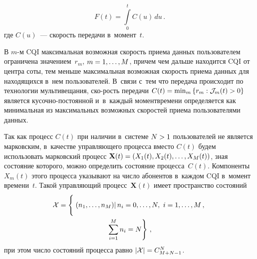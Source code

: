 \begin{multicols}{2}
\noindent
  \begin{equation*}
  F(t)=\int\limits_0^t C(u)\,du\,.
  \end{equation*}
где $C(u)$~--- скорость передачи в~момент~$t$.

  В $m$-м CQI максимальная возможная скорость приема данных 
пользователем ограничена значением~$r_m$, $m\hm=1,\ldots ,M$, причем чем 
дальше находится CQI от центра соты, тем меньше максимальная возможная 
скорость приема данных для находящихся в~нем пользователей. В~связи с~тем 
что передача происходит по технологии мультивещания, ско-\linebreak рость передачи 
$C(t)\hm= \min\nolimits_m \left\{ r_m: {\cal{J}}_m(t)>0\right\}$ является  
ку\-соч\-но-по\-сто\-ян\-ной и~в~каждый момент\linebreak времени определяется как 
минимальная из максимальных возможных скоростей приема пользователями 
данных.
  
  Так как процесс $C(t)$ при наличии в~системе $N\hm>1$ пользователей не 
является марковским, в~качестве управляющего процесса вместо $C(t)$ будем 
использовать марковский процесс $\mathbf{X}(t)\hm= \left( X_1(t), X_2(t), \ldots , 
X_M(t)\right)$, зная состояние которого, можно определить состояние 
процесса~$C(t)$. Компоненты~$X_m(t)$ этого процесса указывают на число 
абонентов в~каждом CQI в~момент времени~$t$. Такой управляющий 
процесс~$\mathbf{X}(t)$ имеет пространство состояний
\begin{multline*}
  \mathcal{X}=\left\{ \vphantom{\sum\limits_{i=1}^M}
  \left.\left( n_1,\ldots, n_M\right) 
  \right\vert n_i=0,\ldots, N,\ 
i=1,\ldots , M\,,\right.\\
\left. \sum\limits_{i=1}^M n_i=N\right\}\,,
\end{multline*}
при этом число состояний процесса равно $\vert{\cal{X}}\vert \hm=  
C^N_{M+N-1}$.
  

\end{multicols}
